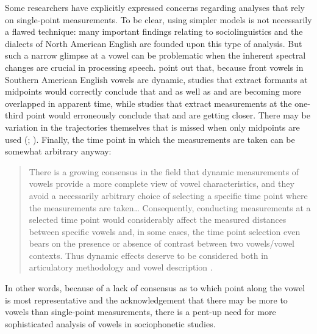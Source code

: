Some researchers have explicitly expressed concerns regarding analyses that rely on single-point measurements. To be clear, using simpler models is not necessarily a flawed technique: many important findings relating to sociolinguistics and the dialects of North American English are founded upon this type of analysis. But such a narrow glimpse at a vowel can be problematic when the inherent spectral changes are crucial in processing speech. \citet{renwick_stanley_2020} point out that, because front vowels in Southern American English vowels are dynamic, studies that extract formants at midpoints would correctly conclude that \fleece and \kit as well as \face and \dress are becoming more overlapped in apparent time, while studies that extract measurements at the one-third point would erroneously conclude that \kit and \face are getting closer. There may be variation in the trajectories themselves that is missed when only midpoints are used (\citealt[57]{swan_2016_diss}; \citealt[288]{jacewicz_etal_2006}). Finally, the time point in which the measurements are taken can be somewhat arbitrary anyway:
\begin{quote}
    There is a growing consensus in the field that dynamic measurements of vowels provide a more complete view of vowel characteristics, and they avoid a necessarily arbitrary choice of selecting a specific time point where the measurements are taken… Consequently, conducting measurements at a selected time point would considerably affect the measured distances between specific vowels and, in some cases, the time point selection even bears on the presence or absence of contrast between two vowels/vowel contexts. Thus dynamic effects deserve to be considered both in articulatory methodology and vowel description \citep[330]{strycharczuk_scobbie_2017}.
\end{quote}
In other words, because of a lack of consensus as to which point along the vowel is most representative and the acknowledgement that there may be more to vowels than single-point measurements, there is a pent-up need for more sophisticated analysis of vowels in sociophonetic studies.


